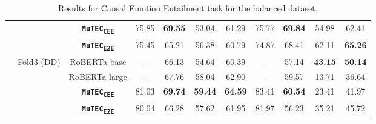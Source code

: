 \documentclass{article}
\newcommand{\subtwo}{\textbf{\texttt{MuTEC\textsubscript{CEE}}}}
\newcommand{\overall}{\textbf{\texttt{MuTEC\textsubscript{E2E}}}}
\begin{document}
\begin{table*}[h]
{\begin{tabular}{|c|c|c|cccc|cccc|}
 &
   &
  \subtwo &
  \multicolumn{1}{c|}{75.85} &
  \multicolumn{1}{c|}{\textbf{69.55}} &
  \multicolumn{1}{c|}{53.04} &
  61.29 &
  \multicolumn{1}{c|}{75.77} &
  \multicolumn{1}{c|}{\textbf{69.84}} &
  \multicolumn{1}{c|}{54.98} &
  62.41 
  \\ \cline{3-11} 
 &
   &
  \overall &
  \multicolumn{1}{c|}{75.45} &
  \multicolumn{1}{c|}{65.21} &
  \multicolumn{1}{c|}{56.38} &
  60.79 &
  \multicolumn{1}{c|}{74.87} &
  \multicolumn{1}{c|}{68.41} &
  \multicolumn{1}{c|}{62.11} &
  \textbf{65.26}
  \\ \cline{2-11} 
 &
  \multirow{3}{*}{Fold3 (DD)} &
  RoBERTa-base &
  \multicolumn{1}{c|}{-} &
  \multicolumn{1}{c|}{66.13} &
  \multicolumn{1}{c|}{54.64} &
   60.39 &
  \multicolumn{1}{c|}{-} &
  \multicolumn{1}{c|}{57.14} &
  \multicolumn{1}{c|}{\textbf{43.15}} &
   \textbf{50.14}
   \\ \cline{3-11} 
 &
   &
  RoBERTa-large &
  \multicolumn{1}{c|}{-} &
  \multicolumn{1}{c|}{67.76} &
  \multicolumn{1}{c|}{58.04} &
   62.90 &
  \multicolumn{1}{c|}{-} &
  \multicolumn{1}{c|}{59.57} &
  \multicolumn{1}{c|}{13.71} &
  36.64 
   \\ \cline{3-11} 
 &
   &
  \subtwo &
  \multicolumn{1}{c|}{81.03} &
  \multicolumn{1}{c|}{\textbf{69.74}} &
  \multicolumn{1}{c|}{\textbf{59.44}} &
  \textbf{64.59} &
  \multicolumn{1}{c|}{83.41} &
  \multicolumn{1}{c|}{\textbf{60.54}} &
  \multicolumn{1}{c|}{23.41} &
  41.97 
  \\ \cline{3-11} 
 &
   &
  \overall &
  \multicolumn{1}{c|}{80.04} &
  \multicolumn{1}{c|}{66.28} &
  \multicolumn{1}{c|}{57.62} &
  61.95 &
  \multicolumn{1}{c|}{81.97} &
  \multicolumn{1}{c|}{56.23} &
  \multicolumn{1}{c|}{35.21} &
  45.72
  \\ \hline
\end{tabular}
}
\caption{Results for Causal Emotion Entailment task for the balanced dataset.}
\label{tab:sub2_balanced}
\vspace{-5mm}
\end{table*}
 
\end{document}
